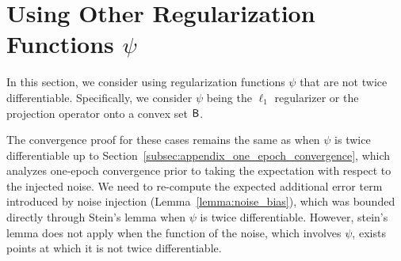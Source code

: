

\section{Using Other Regularization Functions $\psi$}
\label{sec:appendix_other_reg}

In this section, we consider using regularization functions $\psi$ that are not twice differentiable.
Specifically, we consider $\psi$ being the $\ell_1$ regularizer or the projection operator onto a convex set ${\mathsf{B}}$.

The convergence proof for these cases remains the same as when $\psi$ is twice differentiable up to Section~\ref{subsec:appendix_one_epoch_convergence}, which analyzes one-epoch convergence prior to taking the expectation with respect to the injected noise.
We need to re-compute the expected additional error term introduced by noise injection (Lemma~\ref{lemma:noise_bias}), which was bounded directly through Stein's lemma when $\psi$ is twice differentiable. However, stein's lemma does not apply when the function of the noise, which involves $\psi$, exists points at which it is not twice differentiable.



